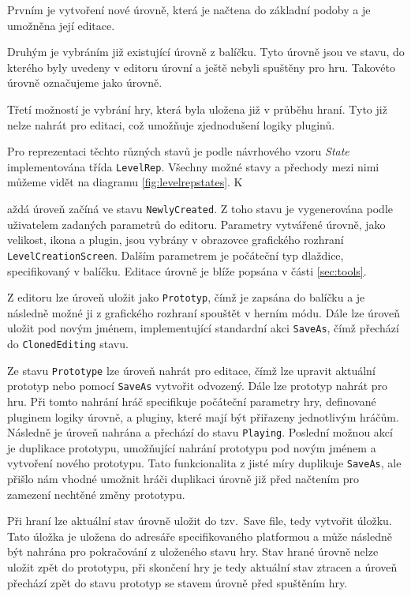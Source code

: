 Prvním je vytvoření nové úrovně, která je načtena do základní podoby a je umožněna její editace. 

Druhým je vybráním již existující úrovně z balíčku. Tyto úrovně jsou ve stavu, do kterého byly uvedeny v editoru úrovní a ještě nebyli spuštěny pro hru. Takovéto úrovně označujeme jako  úrovně.

Třetí možností je vybrání hry, která byla uložena již v průběhu hraní. Tyto již nelze nahrát pro editaci, což umožňuje zjednodušení logiky pluginů. 

Pro reprezentaci těchto různých stavů je podle návrhového vzoru \textit{State} implementována třída \texttt{LevelRep}. Všechny možné stavy a přechody mezi nimi můžeme vidět na diagramu \ref{fig:levelrepstates}. K

aždá úroveň začíná ve stavu \texttt{NewlyCreated}. Z toho stavu je vygenerována podle uživatelem zadaných parametrů do editoru. Parametry vytvářené úrovně, jako velikost, ikona a plugin, jsou vybrány v obrazovce grafického rozhraní \texttt{LevelCreationScreen}. Dalším parametrem je počáteční typ dlaždice, specifikovaný v balíčku.  Editace úrovně je blíže popsána v části \ref{sec:tools}. 

Z editoru lze úroveň uložit jako \texttt{Prototyp}, čímž je zapsána do balíčku a je následně možné ji z grafického rozhraní spouštět v herním módu. Dále lze úroveň uložit pod novým jménem, implementující standardní akci \texttt{SaveAs}, čímž přechází do \texttt{ClonedEditing} stavu. 

Ze stavu \texttt{Prototype} lze úroveň nahrát pro editace, čímž lze upravit aktuální prototyp nebo pomocí \texttt{SaveAs} vytvořit odvozený. Dále lze prototyp nahrát pro hru. Při tomto nahrání hráč specifikuje počáteční parametry hry, definované pluginem logiky úrovně, a pluginy, které mají být přiřazeny jednotlivým hráčům. Následně je úroveň nahrána a přechází do stavu \texttt{Playing}. Poslední možnou akcí je duplikace prototypu, umožňující nahrání prototypu pod novým jménem a vytvoření nového prototypu. Tato funkcionalita z jisté míry duplikuje \texttt{SaveAs}, ale přišlo nám vhodné umožnit hráči duplikaci úrovně již před načtením pro zamezení nechtěné změny prototypu.

Při hraní lze aktuální stav úrovně uložit do tzv.~Save file, tedy vytvořit úložku. Tato úložka je uložena do adresáře specifikovaného platformou a může následně být nahrána pro pokračování z uloženého stavu hry. Stav hrané úrovně nelze uložit zpět do prototypu, při skončení hry je tedy aktuální stav ztracen a úroveň přechází zpět do stavu prototyp se stavem úrovně před spuštěním hry.

